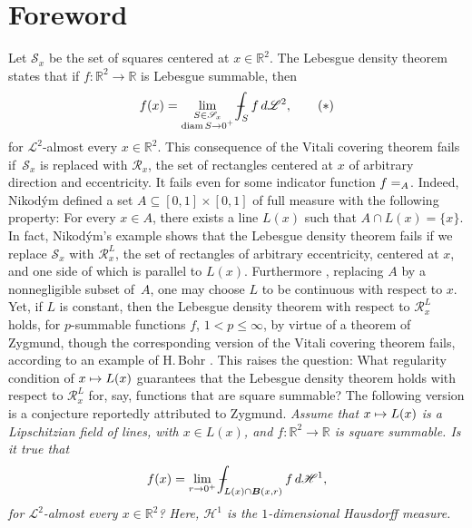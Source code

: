 \documentclass[11pt]{article}
\makeatletter
\theoremstyle{definition}
\theoremstyle{jepanonymous}
\theoremstyle{plain}
\newcommand\mto{\mathchoice{\longmapsto}{\mapsto}{\mapsto}{\mapsto}}
\DeclareRobustCommand{\mathbbm}[1]{\csname jepbb@#1\endcsname}
\newcommand{\R}{\mathbb{R}}
\newcommand{\ind}{\mathbbm{1}}
\newcommand{\calH}{\mathscr{H}}
\newcommand{\calL}{\mathscr{L}}
\newcommand{\calR}{\mathscr{R}}
\newcommand{\calS}{\mathscr{S}}
\newcommand{\bB}{{\boldsymbol{B}}}
\DeclareMathOperator{\rmdiam}{\mathrm{diam}}
\def\Xint#1{\mathchoice
{\XXint\displaystyle\textstyle{#1}}{\XXint\textstyle\scriptstyle{#1}}{\XXint\scriptstyle\scriptscriptstyle{#1}}{\XXint\scriptscriptstyle
\scriptscriptstyle{#1}}\!\int}
\def\XXint#1#2#3{{\setbox0=\hbox{$#1{#2#3}{\int}$}
\vcenter{\hbox{$#2#3$}}\kern-.5\wd0}}
\def\dashint{\Xint-}
\let\subset\subseteq
\makeatother
\begin{document}
\section{Foreword}

Let $\calS_x$ be the set of squares centered at $x \in \R^2$.
The Lebesgue density theorem states that if $f: \R^2 \to \R$ is Lebesgue summable, then\vspace*{-3pt}
\begin{equation}
\label{eq.intro}
f(x) = \lim_{\substack{S \in \calS_x\\\rmdiam S \to 0^+}} \dashint_S f \,d\calL^2,\tag{$*$}
\end{equation}
for $\calL^2$-almost every $x \in \R^2$.
This consequence of the Vitali covering theorem fails if~$\calS_x$ is replaced with $\calR_x$, the set of rectangles centered at $x$ of arbitrary direction and eccentricity.
It fails even for some indicator function $f = \ind_A$.
Indeed, Nikod\'ym \cite{NIK.27} defined a set $A \subset [0,1] \times [0,1]$ of full measure with the following property: For every $x \in A$, there exists a line $L(x)$ such that $A \cap L(x) = \{x\}$.
In fact, Nikod\'ym's example shows that the Lebesgue density theorem fails if we replace $\calS_x$ with $\calR_x^L$, the set of rectangles of arbitrary eccentricity, centered at $x$, and one side of which is parallel to $L(x)$.
Furthermore \cite[Chap.\,IV, Th.\,3.5]{GUZMAN.1981}, replacing $A$ by a nonnegligible subset of~$A$, one may choose $L$ to be continuous with respect to $x$.
Yet, if $L$ is constant, then the Lebesgue density theorem with respect to $\calR_x^L$ holds, for $p$-summable functions $f$, $1 < p \leq \infty$, by virtue of a theorem of Zygmund, though the corresponding version of the Vitali covering theorem fails, according to an example of H.\,Bohr \cite[Chap.\,IV, Th.\,1.1]{GUZMAN.1981}.
This raises the question: What regularity condition of $x \mto L(x)$ guarantees that the Lebesgue density theorem holds with respect to $\calR_x^L$ for, say, functions that are square summable?
The following version is a conjecture reportedly \cite{LAC.LI.10} attributed to Zygmund.
{\it
Assume that $x \mto L(x)$ is a Lipschitzian field of lines, with $x \in L(x)$, and $f: \R^2 \to \R$ is square summable.
Is it true that\vspace*{-3pt}
\begin{equation*}
f(x) = \lim_{r \to 0^+} \dashint_{L(x) \cap \bB(x,r)} f \,d\calH^1,
\end{equation*}
for $\calL^2$-almost every $x \in \R^2$?
Here, $\calH^1$ is the $1$-dimensional Hausdorff measure.
}
\end{document}
